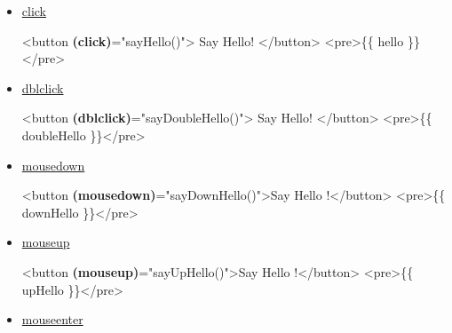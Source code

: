 \documentclass[12pt,]{article}
\newenvironment{Shaded}{}{}
\newcommand{\KeywordTok}[1]{\textcolor[rgb]{0.00,0.00,1.00}{{#1}}}
\newcommand{\StringTok}[1]{\textcolor[rgb]{0.00,0.50,0.50}{{#1}}}
\newcommand{\OtherTok}[1]{\textcolor[rgb]{1.00,0.25,0.00}{{#1}}}
\newcommand{\ErrorTok}[1]{\textcolor[rgb]{1.00,0.00,0.00}{\textbf{{#1}}}}
\newcommand{\NormalTok}[1]{{#1}}
\begin{document}
\begin{itemize}
\item
  \href{https://developer.mozilla.org/en-US/docs/Web/Events/click}{click}

\begin{Shaded}
\begin{Highlighting}[numbers=left,,]
\KeywordTok{<button} \ErrorTok{(click)}\OtherTok{=}\StringTok{"sayHello()"}\KeywordTok{>} \NormalTok{Say Hello! }\KeywordTok{</button>}
\KeywordTok{<pre>}\NormalTok{\{\{ hello \}\}}\KeywordTok{</pre>}
\end{Highlighting}
\end{Shaded}
\item
  \href{https://developer.mozilla.org/en-US/docs/Web/Events/dblclick}{dblclick}

\begin{Shaded}
\begin{Highlighting}[numbers=left,,]
\KeywordTok{<button} \ErrorTok{(dblclick)}\OtherTok{=}\StringTok{"sayDoubleHello()"}\KeywordTok{>} \NormalTok{Say Hello! }\KeywordTok{</button>}
\KeywordTok{<pre>}\NormalTok{\{\{ doubleHello \}\}}\KeywordTok{</pre>}
\end{Highlighting}
\end{Shaded}
\item
  \href{https://developer.mozilla.org/en-US/docs/Web/Events/mousedown}{mousedown}

\begin{Shaded}
\begin{Highlighting}[numbers=left,,]
\KeywordTok{<button} \ErrorTok{(mousedown)}\OtherTok{=}\StringTok{"sayDownHello()"}\KeywordTok{>}\NormalTok{Say Hello !}\KeywordTok{</button>}
\KeywordTok{<pre>}\NormalTok{\{\{ downHello \}\}}\KeywordTok{</pre>}
\end{Highlighting}
\end{Shaded}
\item
  \href{https://developer.mozilla.org/en-US/docs/Web/Events/mouseup}{mouseup}

\begin{Shaded}
\begin{Highlighting}[numbers=left,,]
\KeywordTok{<button} \ErrorTok{(mouseup)}\OtherTok{=}\StringTok{"sayUpHello()"}\KeywordTok{>}\NormalTok{Say Hello !}\KeywordTok{</button>}
\KeywordTok{<pre>}\NormalTok{\{\{ upHello \}\}}\KeywordTok{</pre>}
\end{Highlighting}
\end{Shaded}
\item
  \href{https://developer.mozilla.org/en-US/docs/Web/Events/mouseenter}{mouseenter}


\end{itemize}
\end{document}
